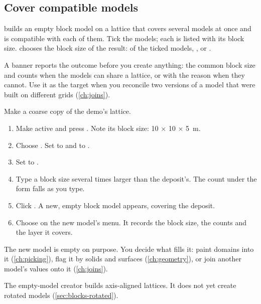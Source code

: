 \subsection{Cover compatible models}

 builds an empty block model on a lattice that covers several models at once and is compatible with each of them. Tick the models; each is listed with its block size.  chooses the block size of the result:  of the ticked models, , or .

A banner reports the outcome before you create anything: the common block size and counts when the models can share a lattice, or  with the reason when they cannot. Use it as the target when you reconcile two versions of a model that were built on different grids (\cref{ch:joins}).

\begin{tryit}
Make a coarse copy of the demo's lattice.
\begin{enumerate}
\item Make  active and press . Note its block size: 10 × 10 × 5~m.
\item Choose . Set  to  and  to .
\item Set  to .
\item Type a block size several times larger than the deposit's. The count under the form falls as you type.
\item Click . A new, empty block model appears, covering the deposit.
\item Choose  on the new model's menu. It records the block size, the counts and the layer it covers.
\end{enumerate}
\end{tryit}

The new model is empty on purpose. You decide what fills it: paint domains into it (\cref{ch:picking}), flag it by solids and surfaces (\cref{ch:geometry}), or join another model's values onto it (\cref{ch:joins}).

\begin{note}
The empty-model creator builds axis-aligned lattices. It does not yet create rotated models (\cref{sec:blocks-rotated}).
\end{note}
